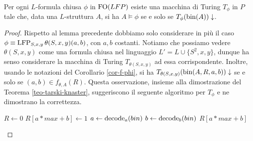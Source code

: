 \begin{lemma}
 Per ogni $L$-formula chiusa $\phi$ in $\operatorname{FO}(LFP)$ esiste
 una macchina di Turing $T_\phi$ in $P$ tale che, data una $L$-struttura $A$,
 si ha $A \models \phi$ se e solo se $T_\phi(\operatorname{bin}(A))\downarrow$.
\end{lemma}
\begin{proof}
  Rispetto al lemma precedente dobbiamo solo considerare in più il caso
  $\phi \equiv \operatorname{LFP}_{S,x,y}\theta(S,x,y)(a,b)$, con $a, b$ costanti.
  Notiamo che possiamo vedere
  $\theta(S,x,y)$ come una formula chiusa nel linguaggio $L'=L \cup \{S^2,x,y\}$,
  dunque ha senso considerare la macchina di Turing $T_{\theta(S,x,y)}$ ad essa
  corrispondente. Inoltre, usando le notazioni del Corollario \ref{cor-f-phi},
  si ha $T_{\theta(S,x,y)}(\operatorname{bin}(A,R,a,b))\downarrow$
  se e solo se $(a,b) \in f_{\theta,A}(R)$. Questa osservazione, insieme alla
  dimostrazione del Teorema \ref{teo-tarski-knaster}, suggeriscono il seguente
  algoritmo per $T_\phi$ e ne dimostrano la correttezza.
  
  \begin{algorithmic}
    \State $R\gets 0$
	\State $R[a*max + b] \gets 1$
      \EndIf
      \EndFor
    \EndFor
    \State $a \gets \operatorname{decode}_a (bin)$
    \State $b \gets \operatorname{decode}_b (bin)$
    \State \Return $R[a*max + b]$
  \EndFunction
  \end{algorithmic}

 
\end{proof}
